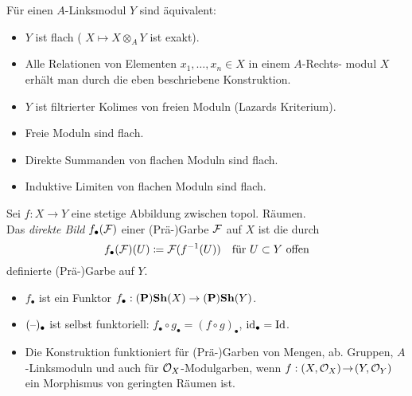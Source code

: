 \documentclass{cheat-sheet}
\begin{document}
\begin{lem}
  Für einen $A$-Linksmodul $Y$ sind äquivalent:
  \begin{itemize}
    \item $Y$ ist flach (\dh{} $X \mapsto X \otimes_A Y$ ist exakt).
    \item Alle Relationen von Elementen $x_1, \ldots, x_n \in X$ in einem $A$-Rechts- modul $X$ erhält man durch die eben beschriebene Konstruktion.
    \item $Y$ ist filtrierter Kolimes von freien Moduln (Lazards Kriterium).
  \end{itemize}
\end{lem}

\begin{lem}
  \begin{itemize}
    \item Freie Moduln sind flach.
    \item Direkte Summanden von flachen Moduln sind flach.
    \item Induktive Limiten von flachen Moduln sind flach.
  \end{itemize}
\end{lem}


\begin{defn}
  Sei $f : X \to Y$ eine stetige Abbildung zwischen topol. Räumen. \\
  Das \emph{direkte Bild} $f_\bullet(\mathcal{F})$ einer (Prä-)Garbe $\mathcal{F}$ auf $X$ ist die durch
  \[
    f_\bullet(\mathcal{F})(U) \coloneqq \mathcal{F}(f^{-1}(U)) \quad
    \text{für $U \subset Y$ offen}
  \]
  definierte (Prä-)Garbe auf $Y$.
\end{defn}

\begin{bem}
  \begin{itemize}
    \item $f_\bullet$ ist ein Funktor $f_\bullet : (\mathbf{P})\mathbf{Sh}(X) \to (\mathbf{P})\mathbf{Sh}(Y)$.
    \item $(\text{--})_\bullet$ ist selbst funktoriell: $f_\bullet \circ g_\bullet = (f \circ g)_\bullet$, $\operatorname{id}_\bullet = \operatorname{Id}$.
    \item Die Konstruktion funktioniert für (Prä-)Garben von Mengen, ab. Gruppen, $A$-Linksmoduln und auch für $\mathcal{O}_X$-Modulgarben, wenn $f : (X, \mathcal{O}_X) \!\to\! (Y, \mathcal{O}_Y)$ ein Morphismus von geringten Räumen ist.
  \end{itemize}
\end{bem}
\end{document}
